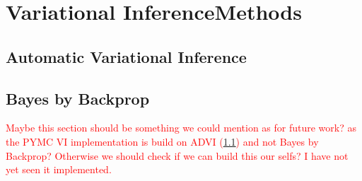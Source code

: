 \section{Variational InferenceMethods}
\subsection{Automatic Variational Inference}\label{sec:ADVI}
\subsection{Bayes by Backprop}
\textcolor{red}{Maybe this section should be something we could mention as for future work? as the PYMC VI implementation is build on ADVI (\ref{sec:ADVI}) and not Bayes by Backprop? Otherwise we should check if we can build this our selfs? I have not yet seen it implemented.}

